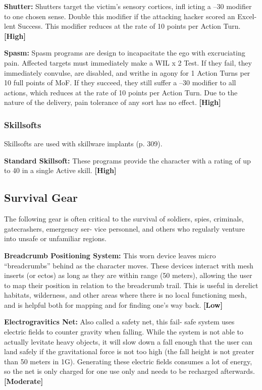 \textbf{Shutter:} Shutters target the victim's sensory cortices, 
infl icting a –30 modifier to one chosen sense. Double 
this modifier if the attacking hacker scored an Excel-
lent Success. This modifier reduces at the rate of 10 
points per Action Turn. \textbf{[High]}

\textbf{Spasm:} Spasm programs are design to incapacitate 
the ego with excruciating pain. Affected targets must 
immediately make a WIL x 2 Test. If they fail, they 
immediately convulse, are disabled, and writhe in 
agony for 1 Action Turns per 10 full points of MoF. 
If they succeed, they still suffer a –30 modifier to all 
actions, which reduces at the rate of 10 points per 
Action Turn. Due to the nature of the delivery, pain 
tolerance of any sort has no effect. \textbf{[High]}

\subsubsection{Skillsofts}

Skillsofts are used with skillware implants (p. 309).

\textbf{Standard Skillsoft:} These programs provide the 
character with a rating of up to 40 in a single Active 
skill. \textbf{[High]}

\subsection{Survival Gear}

The following gear is often critical to the survival of 
soldiers, spies, criminals, gatecrashers, emergency ser-
vice personnel, and others who regularly venture into 
unsafe or unfamiliar regions.

\textbf{Breadcrumb Positioning System: }This worn device 
leaves micro ``breadcrumbs'' behind as the character 
moves. These devices interact with mesh inserts (or 
ectos) as long as they are within range (50 meters), 
allowing the user to map their position in relation to 
the breadcrumb trail. This is useful in derelict habitats, 
wilderness, and other areas where there is no local 
functioning mesh, and is helpful both for mapping 
and for finding one's way back. \textbf{[Low]}

\textbf{Electrogravitics Net:} Also called a safety net, this fail-
safe system uses electric fields to counter gravity when 
falling. While the system is not able to actually levitate 
heavy objects, it will slow down a fall enough that the 
user can land safely if the gravitational force is not too 
high (the fall height is not greater than 50 meters in 
1G). Generating these electric fields consumes a lot of 
energy, so the net is only charged for one use only and 
needs to be recharged afterwards. \textbf{[Moderate]}

